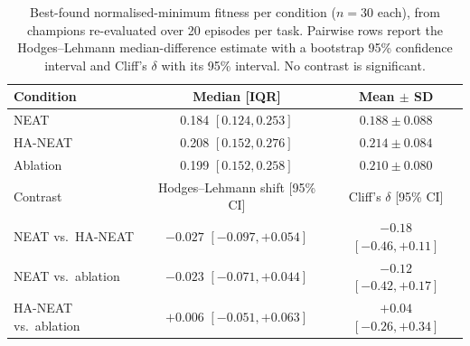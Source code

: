 \documentclass[12pt]{article}
\newcommand{\revAcro}[2]{#2}
\begin{document}
\begin{table}[h]
\centering
\caption{Best-found normalised-minimum fitness per condition ($n = 30$ each), from champions re-evaluated over 20 episodes per task. Pairwise rows report the Hodges--Lehmann median-difference estimate with a bootstrap 95\% confidence interval and Cliff's $\delta$ with its 95\% interval. No contrast is significant.}
\label{tab:main-fitness}
\begin{tabular}{lcc}
\toprule
Condition & Median [IQR] & Mean $\pm$ SD \\
\midrule
NEAT & 0.184 $[0.124, 0.253]$ & $0.188 \pm 0.088$ \\
HA-NEAT & 0.208 $[0.152, 0.276]$ & $0.214 \pm 0.084$ \\
Ablation & 0.199 $[0.152, 0.258]$ & $0.210 \pm 0.080$ \\
\midrule
Contrast & \revAcro{A-02}{Hodges--Lehmann shift} [95\% CI] & Cliff's $\delta$ [95\% CI] \\
\midrule
NEAT vs.\ HA-NEAT & $-0.027$ $[-0.097, +0.054]$ & $-0.18$ $[-0.46, +0.11]$ \\
NEAT vs.\ ablation & $-0.023$ $[-0.071, +0.044]$ & $-0.12$ $[-0.42, +0.17]$ \\
HA-NEAT vs.\ ablation & $+0.006$ $[-0.051, +0.063]$ & $+0.04$ $[-0.26, +0.34]$ \\
\bottomrule
\end{tabular}
\end{table}
\end{document}
